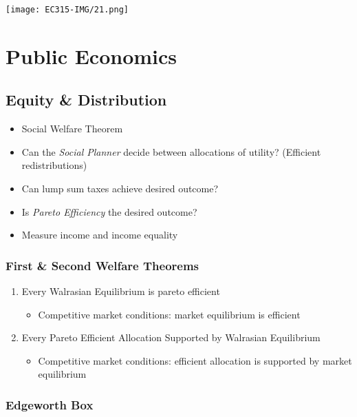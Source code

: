 \documentclass[11pt, english]{article}
\begin{document}
	\begin{center}
		\texttt{[image: EC315-IMG/21.png]}
	\end{center}

\newpage

\section{Public Economics}

	\subsection{Equity \& Distribution}

	\begin{itemize}
	\setlength\itemsep{0cm}
		\item Social Welfare Theorem
		\item Can the \textit{Social Planner} decide between allocations of utility? (Efficient redistributions)
		\item Can lump sum taxes achieve desired outcome?
		\item Is \textit{Pareto Efficiency} the desired outcome?
		\item Measure income and income equality
	\end{itemize}
		
		\subsubsection{First \& Second Welfare Theorems}

	\begin{enumerate}
	\setlength\itemsep{0cm}
		\item Every Walrasian Equilibrium is pareto efficient
		\begin{itemize}
			\item Competitive market conditions: market equilibrium is efficient 
		\end{itemize}
		\item Every Pareto Efficient Allocation Supported by Walrasian Equilibrium
		\begin{itemize}
			\item Competitive market conditions: efficient allocation is supported by market equilibrium
		\end{itemize}
	\end{enumerate}

		\subsubsection{Edgeworth Box}
\end{document}
